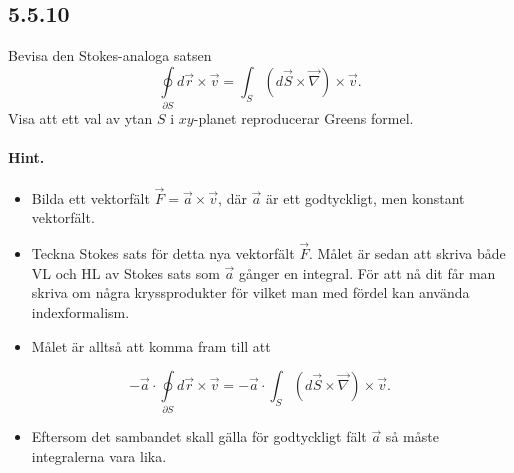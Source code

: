 \documentclass[%
oneside,                 %
final,                   %
10pt]{article}
\newenvironment{doconceexercise}{}{}
\newcounter{doconceexercisecounter}
\begin{document}
\begin{doconceexercise}

\subsection*{5.5.10}

Bevisa den Stokes-analoga satsen 
\begin{equation*}
\oint\limits_{\partial S}d\vec{r}\times\vec v
       =\int_S(d\vec S\times\vec{\nabla})\times\vec v.
\end{equation*}
Visa att ett val
av ytan $S$ i $xy$-planet reproducerar Greens formel.


\paragraph{Hint.}
\begin{itemize}
\item Bilda ett vektorfält $\vec{F} = \vec{a} \times \vec{v}$, där $\vec{a}$ är ett godtyckligt, men konstant vektorfält. 

\item Teckna Stokes sats för detta nya vektorfält $\vec{F}$. Målet är sedan att skriva både VL och HL av Stokes sats som $\vec{a}$ gånger en integral. För att nå dit får man skriva om några kryssprodukter för vilket man med fördel kan använda indexformalism.

\item Målet är alltså att komma fram till att
\end{itemize}

\noindent
$$
-\vec{a} \cdot \oint\limits_{\partial S}d\vec{r}\times\vec v = -\vec{a} \cdot \int_S(d\vec S\times\vec{\nabla})\times\vec v.
$$
\begin{itemize}
\item Eftersom det sambandet skall gälla för godtyckligt fält $\vec{a}$ så måste integralerna vara lika.
\end{itemize}

\noindent

\end{doconceexercise}
\end{document}
